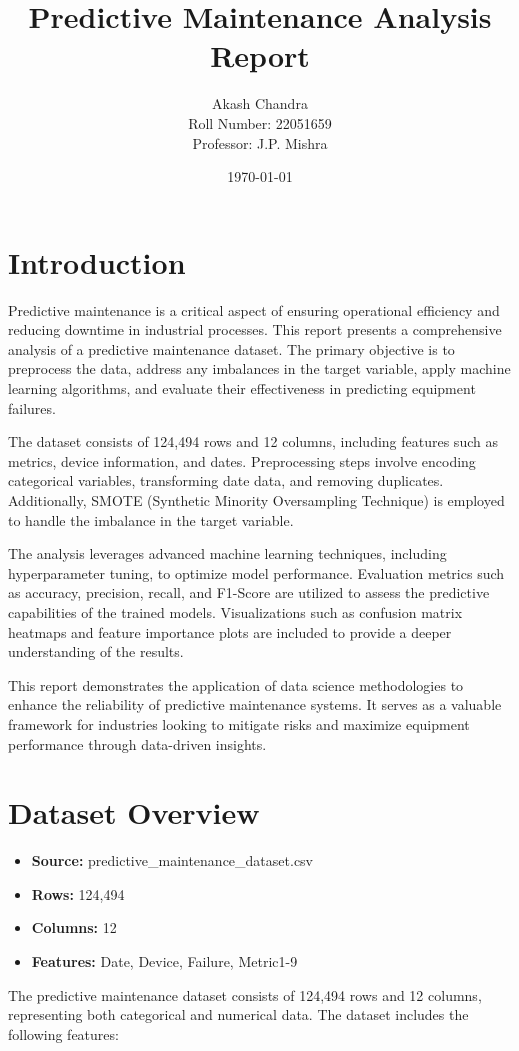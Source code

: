 \documentclass[a4paper,12pt]{article}
\title{Predictive Maintenance Analysis Report}
\author{Akash Chandra \\ Roll Number: 22051659 \\ Professor: J.P. Mishra}
\date{\today}
\begin{document}
	
	\maketitle
	
	\tableofcontents
	
	\section{Introduction}
	Predictive maintenance is a critical aspect of ensuring operational efficiency and reducing downtime in industrial processes. This report presents a comprehensive analysis of a predictive maintenance dataset. The primary objective is to preprocess the data, address any imbalances in the target variable, apply machine learning algorithms, and evaluate their effectiveness in predicting equipment failures.
	
	The dataset consists of 124,494 rows and 12 columns, including features such as metrics, device information, and dates. Preprocessing steps involve encoding categorical variables, transforming date data, and removing duplicates. Additionally, SMOTE (Synthetic Minority Oversampling Technique) is employed to handle the imbalance in the target variable.
	
	The analysis leverages advanced machine learning techniques, including hyperparameter tuning, to optimize model performance. Evaluation metrics such as accuracy, precision, recall, and F1-Score are utilized to assess the predictive capabilities of the trained models. Visualizations such as confusion matrix heatmaps and feature importance plots are included to provide a deeper understanding of the results.
	
	This report demonstrates the application of data science methodologies to enhance the reliability of predictive maintenance systems. It serves as a valuable framework for industries looking to mitigate risks and maximize equipment performance through data-driven insights.
	
	\section{Dataset Overview}
	\begin{itemize}
		\item \textbf{Source:} predictive\_maintenance\_dataset.csv
		\item \textbf{Rows:} 124,494
		\item \textbf{Columns:} 12
		\item \textbf{Features:} Date, Device, Failure, Metric1-9
	\end{itemize}
	The predictive maintenance dataset consists of 124,494 rows and 12 columns, representing both categorical and numerical data. The dataset includes the following features:
	
\end{document}
